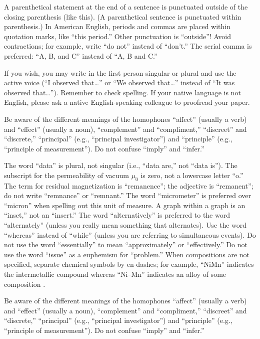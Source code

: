 \documentclass[conf]{new-aiaa}
\begin{document}
A parenthetical statement at the end of a sentence is punctuated outside of the closing parenthesis (like this). (A parenthetical sentence is punctuated within parenthesis.) In American English, periods and commas are placed within quotation marks, like ``this period.'' Other punctuation is ``outside''! Avoid contractions; for example, write ``do not'' instead of ``don’t.'' The serial comma is preferred: ``A, B, and C'' instead of ``A, B and C.''

If you wish, you may write in the first person singular or plural and use the active voice (``I observed that\ldots'' or ``We observed that\ldots'' instead of ``It was observed that\ldots''). Remember to check spelling. If your native language is not English, please ask a native English-speaking colleague to proofread your paper.

Be aware of the different meanings of the homophones ``affect'' (usually a verb) and ``effect'' (usually a noun), ``complement'' and ``compliment,'' ``discreet'' and ``discrete,'' ``principal'' (e.g., ``principal investigator'') and ``principle'' (e.g., ``principle of measurement''). Do not confuse ``imply'' and ``infer.''

The word ``data'' is plural, not singular (i.e., ``data are,'' not ``data is''). The subscript for the permeability of vacuum $\mu_0$ is zero, not a lowercase letter ``o.'' The term for residual magnetization is ``remanence''; the adjective is ``remanent''; do not write ``remnance'' or ``remnant.'' The word ``micrometer'' is preferred over ``micron'' when spelling out this unit of measure. A graph within a graph is an ``inset,'' not an ``insert.'' The word ``alternatively'' is preferred to the word ``alternately'' (unless you really mean something that alternates). Use the word ``whereas'' instead of ``while'' (unless you are referring to simultaneous events). Do not use the word ``essentially'' to mean ``approximately'' or ``effectively.'' Do not use the word ``issue'' as a euphemism for ``problem.'' When compositions are not specified, separate chemical symbols by en-dashes; for example, ``NiMn'' indicates the intermetallic compound  whereas ``Ni--Mn'' indicates an alloy of some composition .

Be aware of the different meanings of the homophones ``affect'' (usually a verb) and ``effect'' (usually a noun), ``complement'' and ``compliment,'' ``discreet'' and ``discrete,'' ``principal'' (e.g., ``principal investigator'') and ``principle'' (e.g., ``principle of measurement''). Do not confuse ``imply'' and ``infer.''
\end{document}
